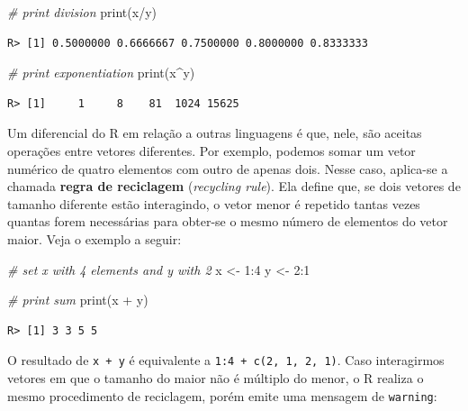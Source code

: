 \documentclass[
  11pt,
]{book}
\newenvironment{Shaded}{\begin{snugshade}}{\end{snugshade}}
\newcommand{\CommentTok}[1]{\textcolor[rgb]{0.37,0.37,0.37}{\textit{#1}}}
\newcommand{\DecValTok}[1]{\textcolor[rgb]{0.06,0.06,0.06}{#1}}
\newcommand{\FunctionTok}[1]{\textcolor[rgb]{0,0,0}{#1}}
\newcommand{\NormalTok}[1]{#1}
\newcommand{\OtherTok}[1]{\textcolor[rgb]{0.37,0.37,0.37}{#1}}
\newcommand{\SpecialCharTok}[1]{\textcolor[rgb]{0,0,0}{#1}}
\begin{document}
\begin{Shaded}
\begin{Highlighting}[]
\CommentTok{\# print division}
\FunctionTok{print}\NormalTok{(x}\SpecialCharTok{/}\NormalTok{y)}
\end{Highlighting}
\end{Shaded}

\begin{verbatim}
R> [1] 0.5000000 0.6666667 0.7500000 0.8000000 0.8333333
\end{verbatim}

\begin{Shaded}
\begin{Highlighting}[]
\CommentTok{\# print exponentiation}
\FunctionTok{print}\NormalTok{(x}\SpecialCharTok{\^{}}\NormalTok{y)}
\end{Highlighting}
\end{Shaded}

\begin{verbatim}
R> [1]     1     8    81  1024 15625
\end{verbatim}

Um diferencial do R em relação a outras linguagens é que, nele, são aceitas operações entre vetores diferentes. Por exemplo, podemos somar um vetor numérico de quatro elementos com outro de apenas dois. Nesse caso, aplica-se a chamada \textbf{regra de reciclagem} (\emph{recycling rule}). Ela define que, se dois vetores de tamanho diferente estão interagindo, o vetor menor é repetido tantas vezes quantas forem necessárias para obter-se o mesmo número de elementos do vetor maior. Veja o exemplo a seguir:

\begin{Shaded}
\begin{Highlighting}[]
\CommentTok{\# set x with 4 elements and y with 2}
\NormalTok{x }\OtherTok{\textless{}{-}} \DecValTok{1}\SpecialCharTok{:}\DecValTok{4}
\NormalTok{y }\OtherTok{\textless{}{-}} \DecValTok{2}\SpecialCharTok{:}\DecValTok{1}

\CommentTok{\# print sum}
\FunctionTok{print}\NormalTok{(x }\SpecialCharTok{+}\NormalTok{ y)}
\end{Highlighting}
\end{Shaded}

\begin{verbatim}
R> [1] 3 3 5 5
\end{verbatim}

O resultado de \texttt{x\ +\ y} é equivalente a \texttt{1:4\ +\ c(2,\ 1,\ 2,\ 1)}. Caso interagirmos vetores em que o tamanho do maior não é múltiplo do menor, o R realiza o mesmo procedimento de reciclagem, porém emite uma mensagem de \texttt{warning}:
\end{document}
